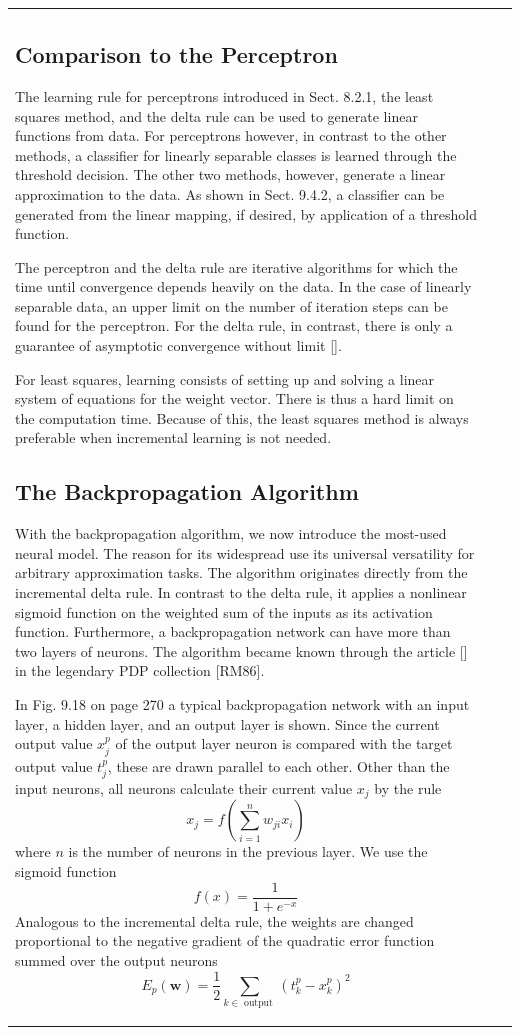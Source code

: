 \documentclass[10pt]{book}
\begin{document}
\begin{center}
\begin{tabular}{|l|l|l|}
\subsection{Comparison to the Perceptron}
The learning rule for perceptrons introduced in Sect. 8.2.1, the least squares method, and the delta rule can be used to generate linear functions from data. For perceptrons however, in contrast to the other methods, a classifier for linearly separable classes is learned through the threshold decision. The other two methods, however, generate a linear approximation to the data. As shown in Sect. 9.4.2, a classifier can be generated from the linear mapping, if desired, by application of a threshold function.

The perceptron and the delta rule are iterative algorithms for which the time until convergence depends heavily on the data. In the case of linearly separable data, an upper limit on the number of iteration steps can be found for the perceptron. For the delta rule, in contrast, there is only a guarantee of asymptotic convergence without limit [\cite{hkp91}].

For least squares, learning consists of setting up and solving a linear system of equations for the weight vector. There is thus a hard limit on the computation time. Because of this, the least squares method is always preferable when incremental learning is not needed.

\subsection{The Backpropagation Algorithm}
With the backpropagation algorithm, we now introduce the most-used neural model. The reason for its widespread use its universal versatility for arbitrary approximation tasks. The algorithm originates directly from the incremental delta rule. In contrast to the delta rule, it applies a nonlinear sigmoid function on the weighted sum of the inputs as its activation function. Furthermore, a backpropagation network can have more than two layers of neurons. The algorithm became known through the article [\cite{rhr86}] in the legendary PDP collection [RM86].

In Fig. 9.18 on page 270 a typical backpropagation network with an input layer, a hidden layer, and an output layer is shown. Since the current output value $x_{j}^{p}$ of the output layer neuron is compared with the target output value $t_{j}^{p}$, these are drawn parallel to each other. Other than the input neurons, all neurons calculate their current value $x_{j}$ by the rule
\begin{equation*}
x_{j}=f\left(\sum_{i=1}^{n} w_{j i} x_{i}\right) \tag{9.14}
\end{equation*}
where $n$ is the number of neurons in the previous layer. We use the sigmoid function
$$
f(x)=\frac{1}{1+e^{-x}}
$$
Analogous to the incremental delta rule, the weights are changed proportional to the negative gradient of the quadratic error function summed over the output neurons
$$
E_{p}(\boldsymbol{w})=\frac{1}{2} \sum_{k \in \text { output }}\left(t_{k}^{p}-x_{k}^{p}\right)^{2}
$$


\end{tabular}
\end{center}
\end{document}
